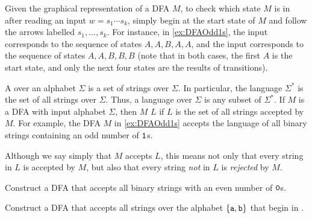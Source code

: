 Given the graphical representation of a DFA $M$, to check which state $M$ is in after reading an input $w = s_1 \cdots s_k$, simply begin at the start state of $M$ and follow the arrows labelled $s_1, \ldots, s_k$. For instance, in \cref{ex:DFAOdd1s}, the input  corresponds to the sequence of states $A, A, B, A, A$, and the input  corresponds to the sequence of states $A, A, B, B, B$ (note that in both cases, the first $A$ is the start state, and only the next four states are the results of transitions).

A  over an alphabet $\Sigma$ is a set of strings over $\Sigma$. In particular, the language $\Sigma^*$ is the set of all strings over $\Sigma$. Thus, a language over $\Sigma$ is any subset of $\Sigma^*$. If $M$ is a DFA with input alphabet $\Sigma$, then $M$  $L$ if $L$ is the set of all strings accepted by $M$. For example, the DFA $M$ in \cref{ex:DFAOdd1s} accepts the language of all binary strings containing an odd number of $\texttt 1$s.

\begin{Note*}
Although we say simply that $M$ accepts $L$, this means not only that every string in $L$ is accepted by $M$, but also that every string \emph{not} in $L$ is \emph{rejected} by $M$.
\end{Note*}

\begin{Exercise}\label{exer:DFAEven0s}
Construct a DFA that accepts all binary strings with an even number of $\texttt 0$s.
\end{Exercise}


\begin{Exercise}\label{exer:DFABeginaab}
Construct a DFA that accepts all strings over the alphabet $\{\texttt a, \texttt b\}$ that begin in .
\end{Exercise}


